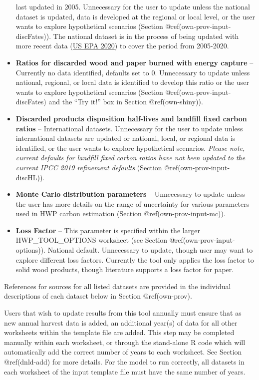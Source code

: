 \documentclass[
  openany]{book}
\begin{document}
\begin{itemize}
  last updated in 2005. Unnecessary for the user to update unless the
  national dataset is updated, data is developed at the regional or
  local level, or the user wants to explore hypothetical scenarios
  (Section @ref(own-prov-input-discFates)). The national dataset is in
  the process of being updated with more recent data
  (\protect\hyperlink{ref-usepa2020}{US EPA 2020}) to cover the period
  from 2005-2020.
\item
  \textbf{Ratios for discarded wood and paper burned with energy
  capture} -- Currently no data identified, defaults set to 0.
  Unnecessary to update unless national, regional, or local data is
  identified to develop this ratio or the user wants to explore
  hypothetical scenarios (Section @ref(own-prov-input-discFates) and the
  ``Try it!'' box in Section @ref(own-shiny)).
\item
  \textbf{Discarded products disposition half-lives and landfill fixed
  carbon ratios} -- International datasets. Unnecessary for the user to
  update unless international datasets are updated or national, local,
  or regional data is identified, or the user wants to explore
  hypothetical scenarios. \emph{Please note, current defaults for
  landfill fixed carbon ratios have not been updated to the current IPCC
  2019 refinement defaults} (Section @ref(own-prov-input-discHL)).
\item
  \textbf{Monte Carlo distribution parameters} -- Unnecessary to update
  unless the user has more details on the range of uncertainty for
  various parameters used in HWP carbon estimation (Section
  @ref(own-prov-input-mc)).
\item
  \textbf{Loss Factor} -- This parameter is specified within the larger
  HWP\_TOOL\_OPTIONS worksheet (see Section
  @ref(own-prov-input-options)). National default. Unnecessary to
  update, though user may want to explore different loss factors.
  Currently the tool only applies the loss factor to solid wood
  products, though literature supports a loss factor for paper.
\end{itemize}

References for sources for all listed datasets are provided in the
individual descriptions of each dataset below in Section @ref(own-prov).

Users that wish to update results from this tool annually must ensure
that as new annual harvest data is added, an additional year(s) of data
for all other worksheets within the template file are added. This step
may be completed manually within each worksheet, or through the
stand-alone R code which will automatically add the correct number of
years to each worksheet. See Section @ref(dnld-add) for more details.
For the model to run correctly, all datasets in each worksheet of the
input template file must have the same number of years.
\end{document}
